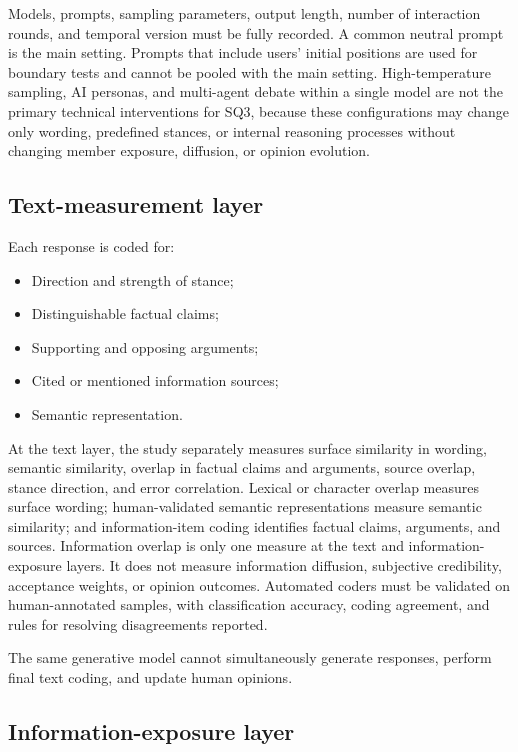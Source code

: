 \documentclass[11pt,a4paper]{article}
\begin{document}
Models, prompts, sampling parameters, output length, number of interaction rounds, and temporal version must be fully recorded. A common neutral prompt is the main setting. Prompts that include users' initial positions are used for boundary tests and cannot be pooled with the main setting. High-temperature sampling, AI personas, and multi-agent debate within a single model are not the primary technical interventions for SQ3, because these configurations may change only wording, predefined stances, or internal reasoning processes without changing member exposure, diffusion, or opinion evolution.

\subsection{Text-measurement layer}

Each response is coded for:

\begin{itemize}
\item Direction and strength of stance;
\item Distinguishable factual claims;
\item Supporting and opposing arguments;
\item Cited or mentioned information sources;
\item Semantic representation.
\end{itemize}

At the text layer, the study separately measures surface similarity in wording, semantic similarity, overlap in factual claims and arguments, source overlap, stance direction, and error correlation. Lexical or character overlap measures surface wording; human-validated semantic representations measure semantic similarity; and information-item coding identifies factual claims, arguments, and sources. Information overlap is only one measure at the text and information-exposure layers. It does not measure information diffusion, subjective credibility, acceptance weights, or opinion outcomes. Automated coders must be validated on human-annotated samples, with classification accuracy, coding agreement, and rules for resolving disagreements reported.

The same generative model cannot simultaneously generate responses, perform final text coding, and update human opinions.

\subsection{Information-exposure layer}
\end{document}
